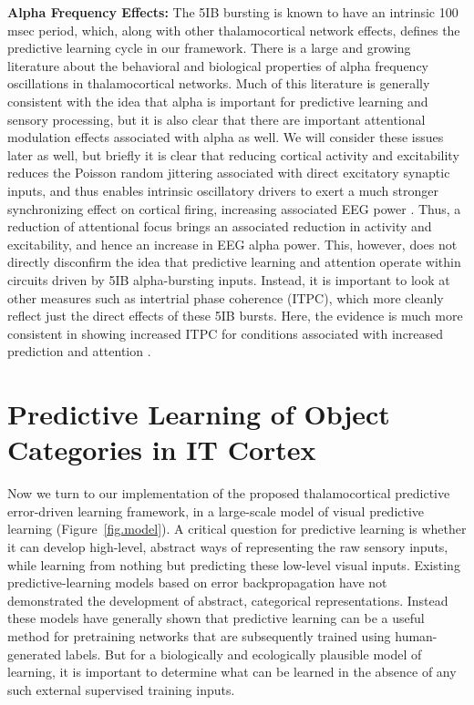 \documentclass[11pt,twoside]{article}
\newif\myifpdf
\begin{document}
{\bf Alpha Frequency Effects:} The 5IB bursting is known to have an intrinsic 100 msec period, which, along with other thalamocortical network effects, defines the predictive learning cycle in our framework.  There is a large and growing literature about the behavioral and biological properties of alpha frequency oscillations in thalamocortical networks.  Much of this literature is generally consistent with the idea that alpha is important for predictive learning and sensory processing, but it is also clear that there are important attentional modulation effects associated with alpha as well.  We will consider these issues later as well, but briefly it is clear that reducing cortical activity and excitability reduces the Poisson random jittering associated with direct excitatory synaptic inputs, and thus enables intrinsic oscillatory drivers to exert a much stronger synchronizing effect on cortical firing, increasing associated EEG power \cite{ZhouSchaferDesimone16,KlimeschSausengHanslmayr07,JensenMazaheri10}.  Thus, a reduction of attentional focus brings an associated reduction in activity and excitability, and hence an increase in EEG alpha power.  This, however, does not directly disconfirm the idea that predictive learning and attention operate within circuits driven by 5IB alpha-bursting inputs.  Instead, it is important to look at other measures such as intertrial phase coherence (ITPC), which more cleanly reflect just the direct effects of these 5IB bursts.  Here, the evidence is much more consistent in showing increased ITPC for conditions associated with increased prediction and attention \cite{papers}.

\section{Predictive Learning of Object Categories in IT Cortex}

Now we turn to our implementation of the proposed thalamocortical predictive error-driven learning framework, in a large-scale model of visual predictive learning (Figure~\ref{fig.model}).  A critical question for predictive learning is whether it can develop high-level, abstract ways of representing the raw sensory inputs, while learning from nothing but predicting these low-level visual inputs.  Existing predictive-learning models based on error backpropagation \cite{LotterKreimanCox16} have not demonstrated the development of abstract, categorical representations.  Instead these models have generally shown that predictive learning can be a useful method for pretraining networks that are subsequently trained using human-generated labels.  But for a biologically and ecologically plausible model of learning, it is important to determine what can be learned in the absence of any such external supervised training inputs.
\end{document}
